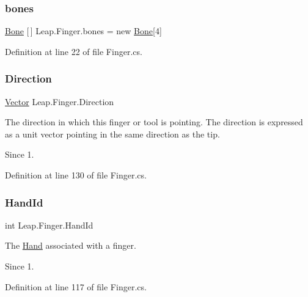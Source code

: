 \subsubsection{\texorpdfstring{bones}{bones}}
{\footnotesize\ttfamily \mbox{\hyperlink{class_leap_1_1_bone}{Bone}} \mbox{[}$\,$\mbox{]} Leap.\+Finger.\+bones = new \mbox{\hyperlink{class_leap_1_1_bone}{Bone}}\mbox{[}4\mbox{]}}



Definition at line 22 of file Finger.\+cs.

\mbox{\label{class_leap_1_1_finger_ad9d71051a8cc2cd262226da61a43afd1}} 
\subsubsection{\texorpdfstring{Direction}{Direction}}
{\footnotesize\ttfamily \mbox{\hyperlink{struct_leap_1_1_vector}{Vector}} Leap.\+Finger.\+Direction}



The direction in which this finger or tool is pointing. The direction is expressed as a unit vector pointing in the same direction as the tip. 

\begin{DoxySince}{Since}
1. 
\end{DoxySince}


Definition at line 130 of file Finger.\+cs.

\mbox{\label{class_leap_1_1_finger_ad9dbae16ebf61f9615d6a420bfc9d22e}} 
\subsubsection{\texorpdfstring{HandId}{HandId}}
{\footnotesize\ttfamily int Leap.\+Finger.\+Hand\+Id}



The \mbox{\hyperlink{class_leap_1_1_hand}{Hand}} associated with a finger. 

\begin{DoxySince}{Since}
1. 
\end{DoxySince}


Definition at line 117 of file Finger.\+cs.

